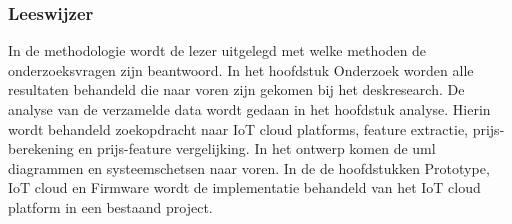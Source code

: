\subsubsection{Leeswijzer}
In  de methodologie wordt de lezer uitgelegd met welke methoden de onderzoeksvragen zijn beantwoord. In het hoofdstuk Onderzoek worden alle resultaten behandeld die naar voren zijn gekomen bij het deskresearch. De analyse van de verzamelde data wordt gedaan in het hoofdstuk analyse. Hierin wordt behandeld zoekopdracht naar IoT cloud platforms, feature extractie, prijs-berekening en prijs-feature vergelijking. In het ontwerp komen de uml diagrammen en systeemschetsen naar voren. In de  de hoofdstukken Prototype, IoT cloud en Firmware wordt de implementatie behandeld van het IoT cloud platform in een bestaand project.




